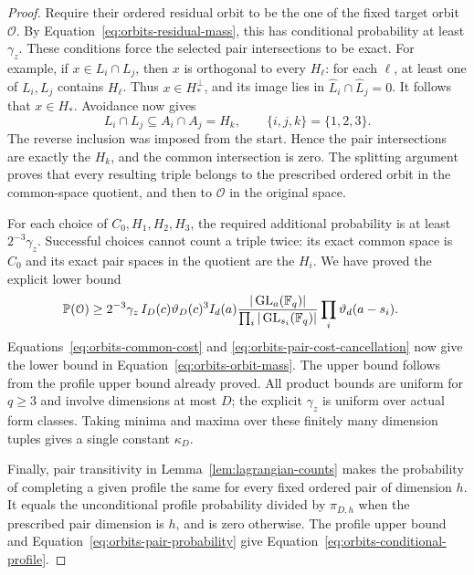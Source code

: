 \begin{proof}
Require their ordered residual orbit to be the one of the fixed target
orbit $\mathcal O$.  By Equation~\eqref{eq:orbits-residual-mass}, this
has conditional probability at least $\gamma_z$.  These conditions
force the selected pair intersections to be exact.  For example, if
$x\in L_i\cap L_j$, then $x$ is orthogonal to every $H_\ell$:
for each $\ell$, at least one of $L_i,L_j$ contains $H_\ell$.
Thus $x\in H_*^\perp$, and its image lies in
$\widehat L_i\cap\widehat L_j=0$.  It follows that $x\in H_*$.
Avoidance now gives
\begin{equation}
 L_i\cap L_j\subseteq A_i\cap A_j=H_k,
 \qquad \{i,j,k\}=\{1,2,3\}.
 \label{eq:orbits-exact-pairs}
\end{equation}
The reverse inclusion was imposed from the start.  Hence the pair
intersections are exactly the $H_k$, and the common intersection is
zero.  The splitting argument proves that every resulting triple
belongs to the prescribed ordered orbit in the common-space quotient,
and then to $\mathcal O$ in the original space.

For each choice of $C_0,H_1,H_2,H_3$, the required additional probability
is at least $2^{-3}\gamma_z$.  Successful choices cannot count a triple
twice: its exact common space is $C_0$ and its exact pair spaces in the
quotient are the $H_i$.  We have proved the explicit lower bound
\begin{align}
 \mathbb P(\mathcal O)\ge{}&2^{-3}\gamma_z\,
 I_D(c)\vartheta_D(c)^3
 I_d(a)\frac{|\operatorname{GL}_a(\mathbb F_q)|}
 {\prod_i|\operatorname{GL}_{s_i}(\mathbb F_q)|}
 \prod_i\vartheta_d(a-s_i).
 \label{eq:orbits-explicit-lower-bound}
\end{align}
Equations~\eqref{eq:orbits-common-cost} and
\eqref{eq:orbits-pair-cost-cancellation} now give the lower bound in
Equation~\eqref{eq:orbits-orbit-mass}.  The upper bound follows from
the profile upper bound already proved.  All product bounds are
uniform for $q\ge3$ and involve dimensions at most $D$; the explicit
$\gamma_z$ is uniform over actual form classes.  Taking minima and
maxima over these finitely many dimension tuples gives a single
constant $\kappa_D$.

Finally, pair transitivity in Lemma~\ref{lem:lagrangian-counts} makes
the probability of completing a given profile the same for every
fixed ordered pair of dimension $h$.  It equals the unconditional
profile probability divided by $\pi_{D,h}$ when the prescribed pair
dimension is $h$, and is zero otherwise.  The profile upper bound
and Equation~\eqref{eq:orbits-pair-probability} give
Equation~\eqref{eq:orbits-conditional-profile}.
\end{proof}
